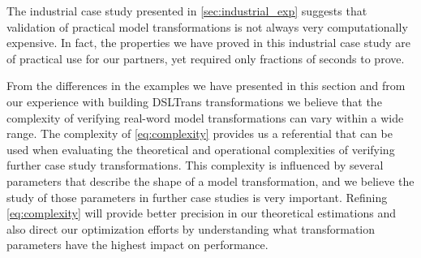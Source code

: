 The industrial case study presented in \cref{sec:industrial_exp} suggests
that validation of practical model transformations is not always very
computationally expensive. In fact, the properties we have proved in this
industrial case study are of practical use for our partners, yet required only fractions of seconds to prove.

From the differences in the examples we have presented in this section and from
our experience with building DSLTrans transformations we believe that the
complexity of verifying real-word model transformations can vary within a wide
range. The complexity of \cref{eq:complexity} provides us a referential that can
be used when evaluating the theoretical and operational complexities of
verifying further case study transformations. This complexity is influenced by several parameters that describe the shape of a model
transformation, and we believe the study of those parameters in further case studies is very
important. Refining \cref{eq:complexity} will provide better precision in our theoretical estimations and also direct our
optimization efforts by understanding what transformation parameters have the
highest impact on performance.

% 
% 
% 





